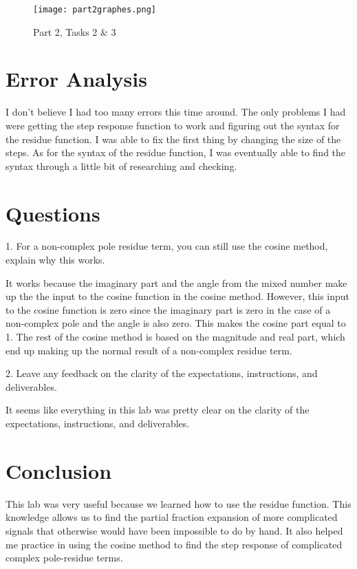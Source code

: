 \documentclass[12pt]{report}
\begin{document}
\begin{figure}[H]
\begin{center}
\caption{Part 2, Tasks 2 \& 3}
\texttt{[image: part2graphes.png]}
\end{center}
\end{figure}


\section{Error Analysis}
I don't believe I had too many errors this time around. The only problems I had were getting the
step response function to work and figuring out the syntax for the residue function. I was able to
fix the first thing by changing the size of the steps. As for the syntax of the residue function,
I was eventually able to find the syntax through a little bit of researching
and checking.

\section{Questions}
1. For a non-complex pole residue term, you can still use the cosine
method, explain why this works.

It works because the imaginary part and the angle from the mixed number
make up the the input to the cosine function in the cosine method. However,
this input to the cosine function is zero since the imaginary part is zero
in the case of a non-complex pole and the angle is also zero. This makes
the cosine part equal to 1. The rest of the cosine method is based on the
magnitude and real part, which end up making up the normal result of a
non-complex residue term.

2. Leave any feedback on the clarity of the expectations, instructions, and deliverables.

It seems like everything in this lab was pretty clear on the clarity of the
expectations, instructions, and deliverables. 

\section{Conclusion}
This lab was very useful because we learned how to use the residue
function. This knowledge allows us to find the partial fraction expansion
of more complicated signals that otherwise would have been impossible to
do by hand. It also helped me practice in using the cosine method to find the
step response of complicated complex pole-residue terms.
\end{document}
